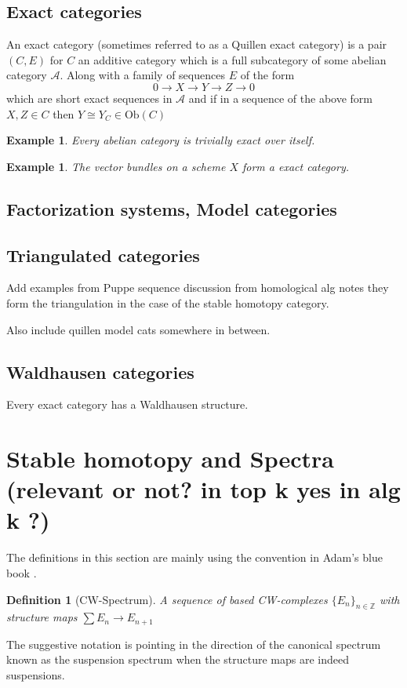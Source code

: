 \documentclass[12pt]{article}
\numberwithin{equation}{section}
\newcounter{dummy} \numberwithin{dummy}{section}
\newtheorem{definition}[dummy]{Definition}
\newtheorem{example}[dummy]{Example}
\begin{document}
\begin{appendices}
	\subsection{Exact categories}
	An exact category (sometimes referred to as a Quillen exact category) is a pair $(C,E)$ for $C$ an additive category which is a full subcategory of some abelian category $\mathcal{A}$. Along with a family of sequences $E$ of the form \[ 0 \to X \to Y \to Z \to 0 \] which are short exact sequences in $\mathcal{A}$ and if in a sequence of the above form $X, Z \in C$ then $Y \cong Y_C \in \mathrm{Ob}(C)$
	\begin{example}
		Every abelian category is trivially exact over itself.
	\end{example}
	\begin{example}
		The vector bundles on a scheme $X$ form a exact category.
	\end{example}
	\subsection{Factorization systems, Model categories}
	\subsection{Triangulated categories}
	Add examples from Puppe sequence discussion from homological alg notes they form the triangulation in the case of the stable homotopy category.
	
	Also include quillen model cats somewhere in between.
	
	\subsection{Waldhausen categories}
	Every exact category has a Waldhausen structure.
	\section{Stable homotopy and Spectra (relevant or not? in top k yes in alg k ?) }
	The definitions in this section are mainly using the convention in Adam's blue book \cite{adams1974stable}.
	\begin{definition}[CW-Spectrum]
		A sequence of based CW-complexes $\{E_n\}_{n \in \mathbb{Z}}$ with structure maps $\sum E_n \to E_{n+1}$
	\end{definition}
	The suggestive notation is pointing in the direction of the canonical spectrum known as the suspension spectrum when the structure maps are indeed suspensions.
	\end{appendices}
\end{document}

